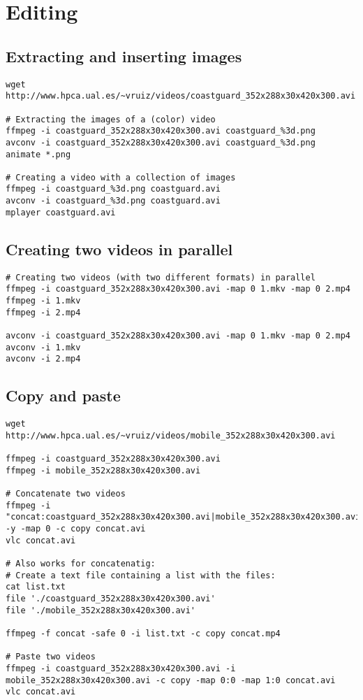 

\chapter{Editing}

\section{Extracting and inserting images}

\begin{verbatim}
wget http://www.hpca.ual.es/~vruiz/videos/coastguard_352x288x30x420x300.avi

# Extracting the images of a (color) video
ffmpeg -i coastguard_352x288x30x420x300.avi coastguard_%3d.png
avconv -i coastguard_352x288x30x420x300.avi coastguard_%3d.png
animate *.png

# Creating a video with a collection of images
ffmpeg -i coastguard_%3d.png coastguard.avi
avconv -i coastguard_%3d.png coastguard.avi
mplayer coastguard.avi
\end{verbatim}


\section{Creating two videos in parallel}

\begin{verbatim}
# Creating two videos (with two different formats) in parallel
ffmpeg -i coastguard_352x288x30x420x300.avi -map 0 1.mkv -map 0 2.mp4
ffmpeg -i 1.mkv
ffmpeg -i 2.mp4

avconv -i coastguard_352x288x30x420x300.avi -map 0 1.mkv -map 0 2.mp4
avconv -i 1.mkv
avconv -i 2.mp4
\end{verbatim}


\section{Copy and paste}

\begin{verbatim}
wget http://www.hpca.ual.es/~vruiz/videos/mobile_352x288x30x420x300.avi

ffmpeg -i coastguard_352x288x30x420x300.avi
ffmpeg -i mobile_352x288x30x420x300.avi

# Concatenate two videos
ffmpeg -i "concat:coastguard_352x288x30x420x300.avi|mobile_352x288x30x420x300.avi" -y -map 0 -c copy concat.avi
vlc concat.avi

# Also works for concatenatig:
# Create a text file containing a list with the files:
cat list.txt
file './coastguard_352x288x30x420x300.avi'
file './mobile_352x288x30x420x300.avi'

ffmpeg -f concat -safe 0 -i list.txt -c copy concat.mp4

# Paste two videos
ffmpeg -i coastguard_352x288x30x420x300.avi -i mobile_352x288x30x420x300.avi -c copy -map 0:0 -map 1:0 concat.avi
vlc concat.avi
\end{verbatim}

